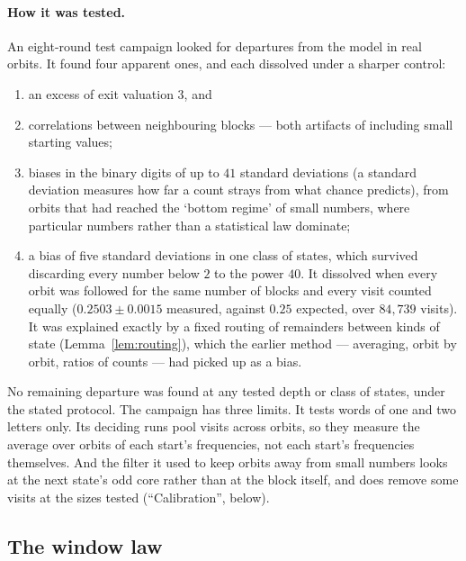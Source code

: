 \documentclass[11pt]{article}
\theoremstyle{remark}
\begin{document}
\paragraph{How it was tested.} An eight-round test campaign looked for departures from the model in real orbits. It found four apparent ones, and each dissolved under a sharper control:
\begin{enumerate}
\item[(1)] an excess of exit valuation $3$, and
\item[(2)] correlations between neighbouring blocks --- both artifacts of including small starting values;
\item[(3)] biases in the binary digits of up to $41$ standard deviations (a standard deviation measures how far a count strays from what chance predicts), from orbits that had reached the `bottom regime' of small numbers, where particular numbers rather than a statistical law dominate;
\item[(4)] a bias of five standard deviations in one class of states, which survived discarding every number below $2$ to the power $40$. It dissolved when every orbit was followed for the same number of blocks and every visit counted equally ($0.2503 \pm 0.0015$ measured, against $0.25$ expected, over $84{,}739$ visits). It was explained exactly by a fixed routing of remainders between kinds of state (Lemma~\ref{lem:routing}), which the earlier method --- averaging, orbit by orbit, ratios of counts --- had picked up as a bias.
\end{enumerate}
No remaining departure was found at any tested depth or class of states, under the stated protocol. The campaign has three limits. It tests words of one and two letters only. Its deciding runs pool visits across orbits, so they measure the average over orbits of each start's frequencies, not each start's frequencies themselves. And the filter it used to keep orbits away from small numbers looks at the next state's odd core rather than at the block itself, and does remove some visits at the sizes tested (``Calibration'', below).

\subsection*{The window law}
\end{document}
